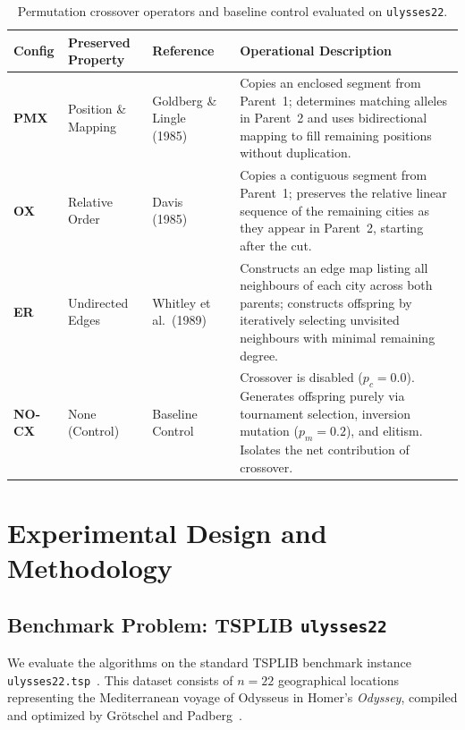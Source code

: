 \documentclass[10pt,a4paper]{article}
\begin{document}
\begin{table}[htbp]
\centering
\footnotesize
\caption{Permutation crossover operators and baseline control evaluated on \texttt{ulysses22}.}
\label{tab:operators}
\begin{tabularx}{\textwidth}{l p{2.6cm} p{3.4cm} >{\RaggedRight\arraybackslash}X}
\toprule
\textbf{Config} & \textbf{Preserved Property} & \textbf{Reference} & \textbf{Operational Description} \\
\midrule
\textbf{PMX} & Position \& Mapping & Goldberg \& Lingle (1985)~\cite{goldberg1985alleles} & Copies an enclosed segment from Parent~1; determines matching alleles in Parent~2 and uses bidirectional mapping to fill remaining positions without duplication. \\
\addlinespace[0.2em]
\textbf{OX} & Relative Order & Davis (1985)~\cite{davis1985applying} & Copies a contiguous segment from Parent~1; preserves the relative linear sequence of the remaining cities as they appear in Parent~2, starting after the cut. \\
\addlinespace[0.2em]
\textbf{ER} & Undirected Edges & Whitley et al.\ (1989)~\cite{whitley1989scheduling} & Constructs an edge map listing all neighbours of each city across both parents; constructs offspring by iteratively selecting unvisited neighbours with minimal remaining degree. \\
\addlinespace[0.2em]
\textbf{NO-CX} & None (Control) & Baseline Control & Crossover is disabled ($p_c = 0.0$). Generates offspring purely via tournament selection, inversion mutation ($p_m = 0.2$), and elitism. Isolates the net contribution of crossover. \\
\bottomrule
\end{tabularx}
\end{table}

\section{Experimental Design and Methodology}
\label{sec:methodology}

\subsection{Benchmark Problem: TSPLIB \texttt{ulysses22}}

We evaluate the algorithms on the standard TSPLIB benchmark instance \texttt{ulysses22.tsp}~\cite{reinelt1991tsplib}. This dataset consists of $n = 22$ geographical locations representing the Mediterranean voyage of Odysseus in Homer's \emph{Odyssey}, compiled and optimized by Gr\"otschel and Padberg~\cite{grotschel2001optimized}. 
\end{document}
